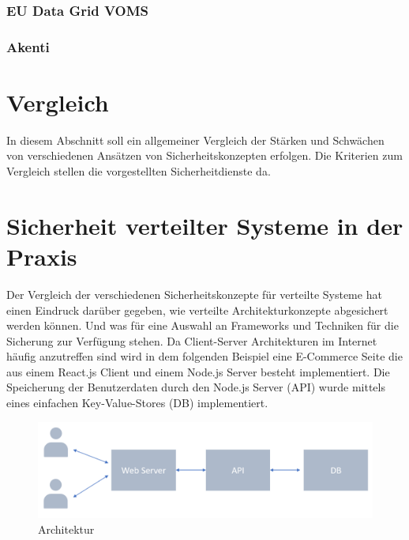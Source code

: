 \documentclass[utf8,biblatex]{lni}
\begin{document}
\subsubsection{EU Data Grid VOMS}

\subsubsection{Akenti}




\section{Vergleich}

In diesem Abschnitt soll ein allgemeiner Vergleich der 
Stärken und Schwächen von verschiedenen Ansätzen von Sicherheitskonzepten erfolgen. 
Die Kriterien zum Vergleich stellen die vorgestellten Sicherheitdienste da. 


\section{Sicherheit verteilter Systeme in der Praxis}

Der Vergleich der verschiedenen Sicherheitskonzepte für verteilte Systeme hat einen Eindruck darüber gegeben, wie 
verteilte Architekturkonzepte abgesichert werden können. Und was für eine Auswahl an Frameworks und Techniken für die Sicherung zur Verfügung stehen.
Da Client-Server Architekturen im Internet häufig anzutreffen sind wird in dem folgenden Beispiel eine E-Commerce Seite die aus einem React.js Client und 
einem Node.js Server besteht implementiert. 
Die Speicherung der Benutzerdaten durch den Node.js Server (API) wurde mittels eines einfachen Key-Value-Stores (DB) implementiert. 

\begin{figure}
  \centering
  \includegraphics[width=\textwidth]{images/architektur.png}
  \caption[Architektur]{Architektur} 
  \label{Architektur}
\end{figure} 
\end{document}
